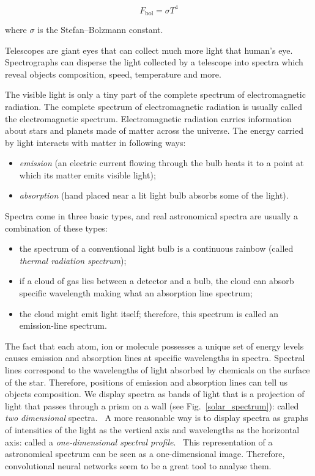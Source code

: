\documentclass[thesis=M,english]{FITthesis}[2012/10/20]
\begin{document}
\begin{equation}
	F_{\mathrm{bol}} = \sigma T^4
\end{equation}

where \(\sigma\) is the Stefan--Bolzmann constant.~\cite{trypsteen2017}

Telescopes are giant eyes that can collect much more light that human's eye.
Spectrographs can disperse the light collected by a telescope into spectra
which reveal objects composition, speed, temperature and more.~\cite{bennett2005}

The visible light is only a tiny part of the complete spectrum of electromagnetic radiation.
The complete spectrum of electromagnetic radiation is usually called the electromagnetic spectrum.
Electromagnetic radiation carries information about stars and planets made of matter across the universe.
The energy carried by light interacts with matter in following ways:

\begin{itemize}
	\item \textit{emission} (an electric current flowing through the bulb heats it to a point at
		which its matter emits visible light);
	\item \textit{absorption} (hand placed near a lit light bulb absorbs some of the light).
\end{itemize}

Spectra come in three basic types, and real astronomical spectra are usually a combination of these types:

\begin{itemize}
	\item the spectrum of a conventional light bulb is a continuous rainbow (called \textit{thermal radiation spectrum});
	\item if a cloud of gas lies between a detector and a bulb,
		the cloud can absorb specific wavelength making what an absorption line spectrum;
	\item the cloud might emit light itself; therefore, this spectrum is called an emission-line spectrum.
\end{itemize}

The fact that each atom, ion or molecule possesses a unique set of energy levels
causes emission and absorption lines at specific wavelengths in spectra.
Spectral lines correspond to the wavelengths of light absorbed by chemicals on the surface of the star.
Therefore, positions of emission and absorption lines can tell us objects composition.
We display spectra as bands of light that is a projection of light that passes through a prism on a wall
(see Fig.~\ref{solar_spectrum}):
called \textit{two dimensional} spectra.~\cite{cochard2018}
A more reasonable way is to display spectra as graphs of intensities of the light as the vertical axis and wavelengths as the horizontal axis:
called a \textit{one-dimensional spectral profile}.~\cite{cochard2018}
This representation of a astronomical spectrum can be seen as a one-dimensional image.
Therefore, convolutional neural networks seem to be a great tool to analyse them.~\cite{bennett2005}
\end{document}
